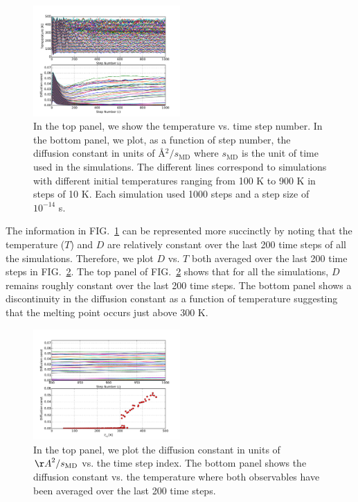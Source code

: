 \documentclass[10pt,showpacs,preprintnumbers,footinbib,amsmath,amssymb,aps,prl,twocolumn,groupedaddress,superscriptaddress,showkeys]{revtex4-1}
\newcommand{\pwrten}[1]{%
	\ensuremath{10^{#1}} }
\begin{document}
\begin{figure}
\centering
	\includegraphics[width=0.5\textwidth]{figures/TDplot.pdf}
	\caption{In the top panel, we show the temperature vs. time
	step number. In the bottom panel, we plot, as a function of
	step number, the diffusion
	constant in units of {\AA}$^2 / s_{\mathrm{MD}}$ where
	$s_{\mathrm{MD}}$ is the unit of time used in the simulations.
	The different lines correspond to simulations with different
	initial temperatures ranging from 100 K to 900 K in steps of
	10 K. Each simulation used 1000 steps and a step size of
	\pwrten{-14} s.}
	\label{fig:TDplot}
\end{figure}

The information in FIG.~\ref{fig:TDplot} can be represented more
succinctly by noting that the temperature ($T$) and $D$ are relatively
constant over the last 200 time steps of all the simulations. Therefore,
we plot $D$ vs. $T$ both averaged over the last 200 time steps in
FIG.~\ref{fig:DavgDplots}. The top panel of FIG.~\ref{fig:DavgDplots}
shows that for all the simulations, $D$ remains roughly constant over
the last 200 time steps. The bottom panel shows a discontinuity in the
diffusion constant as a function of temperature suggesting that the
melting point occurs just above 300 K.

\begin{figure}
\centering
	\includegraphics[width=0.5\textwidth]{figures/DavgDplots.pdf}
	\caption{In the top panel, we plot the diffusion constant
	in units of ${\AA} ^2 / s_{\mathrm{MD}}$ vs.
	the time step index. The bottom panel shows the diffusion
	constant vs. the temperature where both observables have
	been averaged over the last 200 time steps.}
	\label{fig:DavgDplots}
\end{figure}
\end{document}
